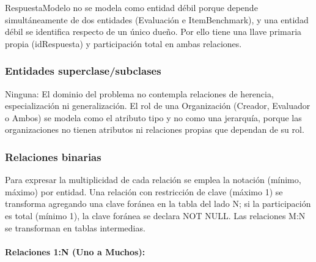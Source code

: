\documentclass[12pt,a4paper]{article}
\begin{document}
RespuestaModelo no se modela como entidad débil porque depende simultáneamente de dos entidades (Evaluación e ItemBenchmark), y una entidad débil se identifica respecto de un único dueño. Por ello tiene una llave primaria propia (idRespuesta) y participación total en ambas relaciones.

\subsubsection{Entidades superclase/subclases}

Ninguna: El dominio del problema no contempla relaciones de herencia, especialización ni generalización. El rol de una Organización (Creador, Evaluador o Ambos) se modela como el atributo tipo y no como una jerarquía, porque las organizaciones no tienen atributos ni relaciones propias que dependan de su rol.

\subsubsection{Relaciones binarias}

Para expresar la multiplicidad de cada relación se emplea la notación (mínimo, máximo) por entidad. Una relación con restricción de clave (máximo 1) se transforma agregando una clave foránea en la tabla del lado N; si la participación es total (mínimo 1), la clave foránea se declara NOT NULL. Las relaciones M:N se transforman en tablas intermedias.

\paragraph{Relaciones 1:N (Uno a Muchos):}
\end{document}
